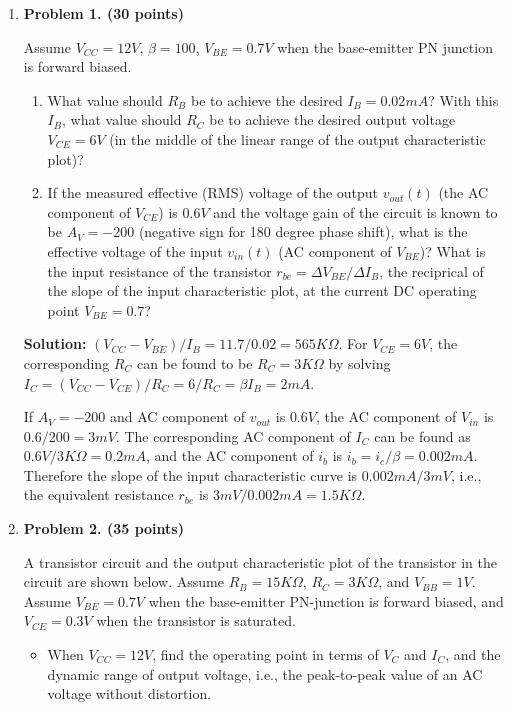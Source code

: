 \begin{enumerate}

\item {\bf Problem 1. (30 points)} 

Assume $V_{CC}=12V$, $\beta=100$, $V_{BE}=0.7V$ when the base-emitter PN 
junction is forward biased. 
\begin{enumerate}
\item What value should $R_B$ be to achieve the desired $I_B=0.02mA$?
With this $I_B$, what value should $R_C$ be to achieve the desired output
voltage $V_{CE}=6V$ (in the middle of the linear range of the output 
characteristic plot)?
\item If the measured effective (RMS) voltage of the output $v_{out}(t)$ 
  (the AC component of $V_{CE}$) is $0.6 V$ and the voltage gain of the
  circuit is known to be $A_V=-200$ (negative sign for 180 degree phase 
  shift), what is the effective voltage of the input $v_{in}(t)$ (AC
  component of $V_{BE}$)? What is the input resistance of the transistor
  $r_{be}=\Delta V_{BE}/\Delta I_B$, the reciprical of the slope of the 
  input characteristic plot, at the current DC operating point $V_{BE}=0.7$?
\end{enumerate}


{\bf Solution:} $(V_{CC}-V_{BE})/I_B=11.7/0.02=565K\Omega$. For 
$V_{CE}=6V$, the corresponding $R_C$ can be found to be $R_C=3K\Omega$
by solving $I_{C}=(V_{CC}-V_{CE})/R_C=6/R_C=\beta I_B=2 mA$.

If $A_V=-200$ and AC component of $v_{out}$ is $0.6 V$, the AC component 
of $V_{in}$ is $0.6/200=3 mV$. The corresponding AC component of $I_C$ 
can be found as $0.6 V/3K\Omega=0.2 mA$, and the AC component of $i_b$
is $i_b=i_c/\beta=0.002 mA$. Therefore the slope of the input 
characteristic curve is $0.002 mA/3 mV$, i.e., the equivalent resistance
$r_{be}$ is $3 mV/0.002 mA=1.5 K\Omega$.


\item {\bf Problem 2. (35 points)} 

A transistor circuit and the output characteristic plot of the transistor 
in the circuit are shown below. Assume $R_B=15 K\Omega$, $R_C=3 K\Omega$, 
and $V_{BB}=1 V$. Assume $V_{BE}=0.7 V$ when the base-emitter PN-junction 
is forward biased, and $V_{CE}=0.3 V$ when the transistor is saturated. 

\begin{itemize}
\item When $V_{CC}=12 V$, find the operating point in terms of $V_C$ 
  and $I_C$, and the dynamic range of output voltage, i.e., the 
  peak-to-peak value of an AC voltage without distortion. 


\end{itemize}
\end{enumerate}
